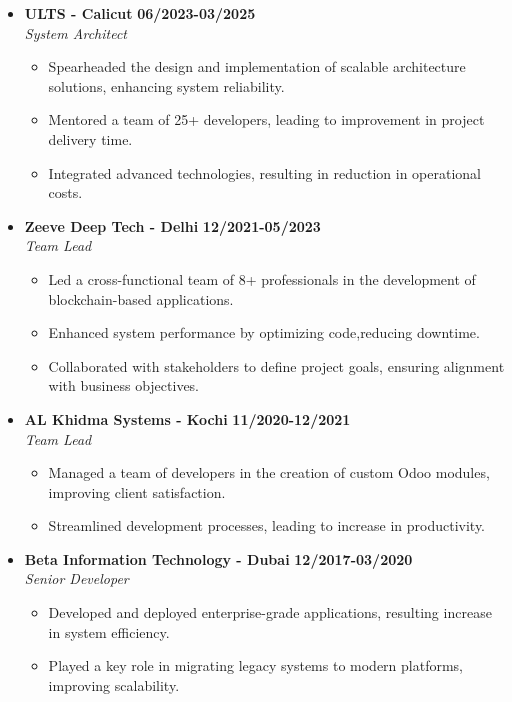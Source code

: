 \documentclass[a4paper,10pt]{article}
\begin{document}
\begin{itemize}[left=0pt, label=$\vcenter{\hbox{\tiny$\bullet$}}$]
    \item \textbf{ULTS - Calicut} \hfill \textbf{06/2023-03/2025} \\
    \textit{System Architect} \\
    \begin{itemize}[left=5pt, label=$\vcenter{\hbox{\tiny$\bullet$}}$]
        \item Spearheaded the design and implementation of scalable architecture solutions, enhancing system reliability.
        \item Mentored a team of 25+ developers, leading to improvement in project delivery time.
        \item Integrated advanced technologies, resulting in reduction in operational costs.
    \end{itemize}

    \item \textbf{Zeeve Deep Tech - Delhi} \hfill \textbf{12/2021-05/2023} \\
    \textit{Team Lead} \\
    \begin{itemize}[left=5pt, label=$\vcenter{\hbox{\tiny$\bullet$}}$]
        \item Led a cross-functional team of 8+ professionals in the development of blockchain-based applications.
        \item Enhanced system performance by optimizing code,reducing downtime.
        \item Collaborated with stakeholders to define project goals, ensuring alignment with business objectives.
    \end{itemize}

    \item \textbf{AL Khidma Systems - Kochi} \hfill \textbf{11/2020-12/2021} \\
    \textit{Team Lead} \\
    \begin{itemize}[left=5pt, label=$\vcenter{\hbox{\tiny$\bullet$}}$]
        \item Managed a team of developers in the creation of custom Odoo modules, improving client satisfaction.
        \item Streamlined development processes, leading to increase in productivity.
    \end{itemize}

    \item \textbf{Beta Information Technology - Dubai} \hfill \textbf{12/2017-03/2020} \\
    \textit{Senior Developer} \\
    \begin{itemize}[left=5pt, label=$\vcenter{\hbox{\tiny$\bullet$}}$]
        \item Developed and deployed enterprise-grade applications, resulting increase in system efficiency.
        \item Played a key role in migrating legacy systems to modern platforms, improving scalability.
    \end{itemize}


\end{itemize}
\end{document}
